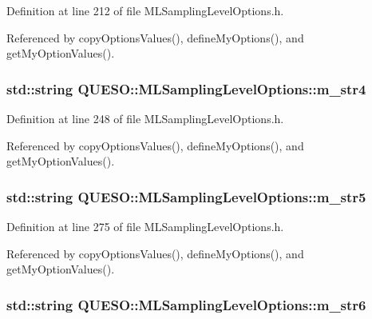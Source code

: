 Definition at line 212 of file M\-L\-Sampling\-Level\-Options.\-h.



Referenced by copy\-Options\-Values(), define\-My\-Options(), and get\-My\-Option\-Values().

\hypertarget{class_q_u_e_s_o_1_1_m_l_sampling_level_options_a399d93049d7862d47c8ac68e1885d0c9}{
\subsubsection[{m\-\_\-str4}]{\setlength{\rightskip}{0pt plus 5cm}std\-::string Q\-U\-E\-S\-O\-::\-M\-L\-Sampling\-Level\-Options\-::m\-\_\-str4}}\label{class_q_u_e_s_o_1_1_m_l_sampling_level_options_a399d93049d7862d47c8ac68e1885d0c9}


Definition at line 248 of file M\-L\-Sampling\-Level\-Options.\-h.



Referenced by copy\-Options\-Values(), define\-My\-Options(), and get\-My\-Option\-Values().

\hypertarget{class_q_u_e_s_o_1_1_m_l_sampling_level_options_a341ed1186366d5483559298a8c5348d2}{
\subsubsection[{m\-\_\-str5}]{\setlength{\rightskip}{0pt plus 5cm}std\-::string Q\-U\-E\-S\-O\-::\-M\-L\-Sampling\-Level\-Options\-::m\-\_\-str5}}\label{class_q_u_e_s_o_1_1_m_l_sampling_level_options_a341ed1186366d5483559298a8c5348d2}


Definition at line 275 of file M\-L\-Sampling\-Level\-Options.\-h.



Referenced by copy\-Options\-Values(), define\-My\-Options(), and get\-My\-Option\-Values().

\hypertarget{class_q_u_e_s_o_1_1_m_l_sampling_level_options_a57c51b01f2dd9dcf3ae13a6891c72b78}{
\subsubsection[{m\-\_\-str6}]{\setlength{\rightskip}{0pt plus 5cm}std\-::string Q\-U\-E\-S\-O\-::\-M\-L\-Sampling\-Level\-Options\-::m\-\_\-str6}}\label{class_q_u_e_s_o_1_1_m_l_sampling_level_options_a57c51b01f2dd9dcf3ae13a6891c72b78}


